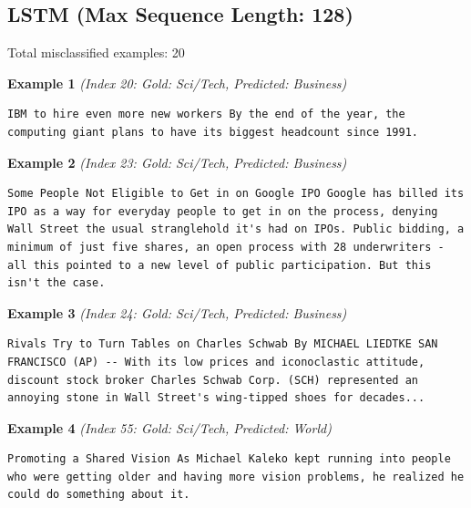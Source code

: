 \subsection{LSTM (Max Sequence Length: 128)}
\label{app:run5}

Total misclassified examples: 20

\noindent
\textbf{Example 1} \quad \textit{(Index 20: Gold: Sci/Tech, Predicted: Business)}

\begin{Verbatim}[breaklines=true,breakanywhere=true,fontsize=\small]
IBM to hire even more new workers By the end of the year, the computing giant plans to have its biggest headcount since 1991.
\end{Verbatim}

\noindent
\textbf{Example 2} \quad \textit{(Index 23: Gold: Sci/Tech, Predicted: Business)}

\begin{Verbatim}[breaklines=true,breakanywhere=true,fontsize=\small]
Some People Not Eligible to Get in on Google IPO Google has billed its IPO as a way for everyday people to get in on the process, denying Wall Street the usual stranglehold it's had on IPOs. Public bidding, a minimum of just five shares, an open process with 28 underwriters - all this pointed to a new level of public participation. But this isn't the case.
\end{Verbatim}

\noindent
\textbf{Example 3} \quad \textit{(Index 24: Gold: Sci/Tech, Predicted: Business)}

\begin{Verbatim}[breaklines=true,breakanywhere=true,fontsize=\small]
Rivals Try to Turn Tables on Charles Schwab By MICHAEL LIEDTKE SAN FRANCISCO (AP) -- With its low prices and iconoclastic attitude, discount stock broker Charles Schwab Corp. (SCH) represented an annoying stone in Wall Street's wing-tipped shoes for decades...
\end{Verbatim}

\noindent
\textbf{Example 4} \quad \textit{(Index 55: Gold: Sci/Tech, Predicted: World)}

\begin{Verbatim}[breaklines=true,breakanywhere=true,fontsize=\small]
Promoting a Shared Vision As Michael Kaleko kept running into people who were getting older and having more vision problems, he realized he could do something about it.
\end{Verbatim}

